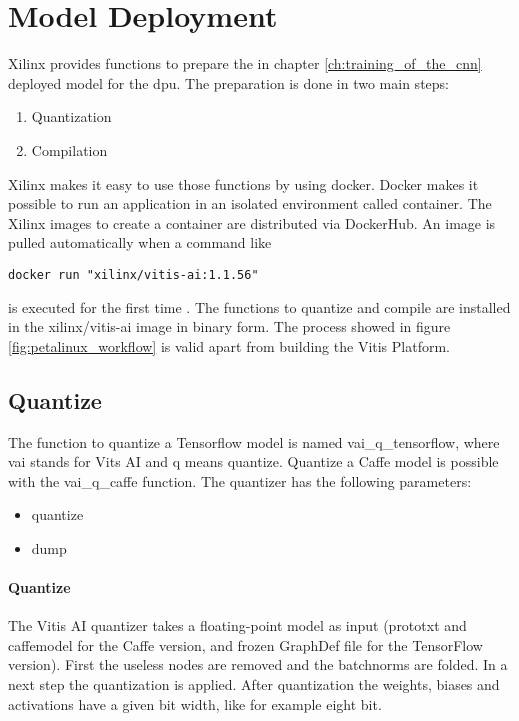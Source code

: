 \section{Model Deployment}
\label{sec:embedded_platform:model_deployment}
Xilinx provides functions to prepare the in chapter \ref{ch:training_of_the_cnn} deployed model for the \acrshort{dpu}.
The preparation is done in two main steps:
\begin{enumerate}
	\item Quantization
	\item Compilation
\end{enumerate}
Xilinx makes it easy to use those functions by using docker.
Docker makes it possible to run an application in an isolated environment called container.
The Xilinx images to create a container are distributed via DockerHub.
An image is pulled automatically when a command like
\begin{lstlisting}[style=bash, caption={}, label=lst:pull_img]
  docker run "xilinx/vitis-ai:1.1.56"
\end{lstlisting}
is executed for the first time \cite{docker_overview}.
The functions to quantize and compile are installed in the xilinx/vitis-ai image in binary form.
The process showed in figure \ref{fig:petalinux_workflow} is valid apart from building the Vitis Platform.

\subsection{Quantize}
\label{subsec:embedded_platform:model_deployment:quantize}
The function to quantize a Tensorflow model is named vai\_q\_tensorflow, where vai stands for Vits AI and q means quantize.
Quantize a Caffe model is possible with the vai\_q\_caffe function.
The quantizer has the following parameters:
\begin{itemize}
	\item quantize
	\item dump
\end{itemize}

\paragraph{Quantize}
The Vitis AI quantizer takes a floating-point model as input (prototxt and caffemodel for the
Caffe version, and frozen GraphDef file for the TensorFlow version).
First the useless nodes are removed and the batchnorms are folded.
In a next step the quantization is applied.
After quantization the weights, biases and activations have a given bit width, like for example eight bit.

